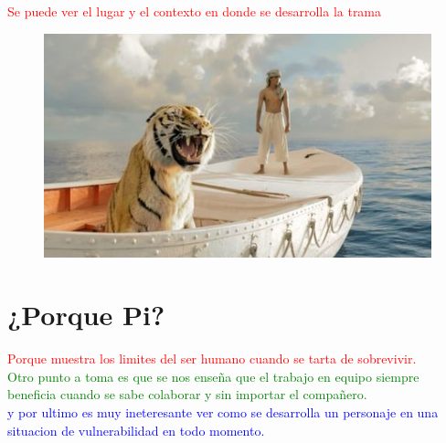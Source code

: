 \documentclass[a5 paper, 11pt]{article}
\begin{document}
\textcolor{red}{Se puede ver el lugar y el contexto en donde se desarrolla la trama}
\begin{figure}[H]
    \includegraphics[scale=0.4,angle=15,right]{pi.jpg}
  
\end{figure}

\section{¿Porque Pi?}
\textcolor{red}{Porque muestra los limites del ser humano cuando se tarta de sobrevivir.}\\
\textcolor{green}{Otro punto a toma es que se nos enseña que el trabajo en equipo siempre beneficia cuando se sabe colaborar y sin importar el compañero.}\\
\textcolor{blue}{y por ultimo es muy ineteresante ver como se desarrolla un personaje en una situacion de vulnerabilidad en todo momento.}\\
\end{document}
